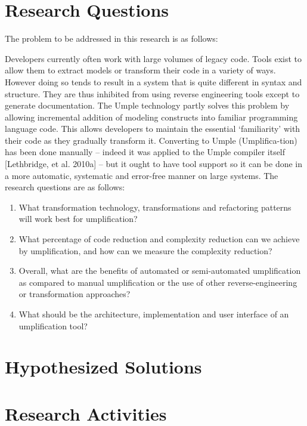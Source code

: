 \section{Research Questions}

The problem to be addressed in this research is as follows:

Developers currently often work with large volumes of legacy code. Tools exist to allow them to extract models or transform their code in a variety of ways. However doing so tends to result in a system that is quite different in syntax and structure. They are thus inhibited from using reverse engineering tools except to generate documentation. The Umple technology partly solves this problem by allowing incremental addition of modeling constructs into familiar programming language code. This allows developers to maintain the essential ‘familiarity’ with their code as they gradually transform it. Converting to Umple (Umplifica-tion) has been done manually – indeed it was applied to the Umple compiler itself [Lethbridge, et al. 2010a] –  but it ought to have tool support so it can be done in a more automatic, systematic and error-free manner on large systems.
The research questions are as follows:

\begin{enumerate}

\item What transformation technology, transformations and refactoring patterns will work best for umplification?
\item What percentage of code reduction and complexity reduction can we achieve by umplification, and how can we measure the complexity reduction?
\item Overall, what are the benefits of automated or semi-automated umplification as compared to manual umplification or the use of other reverse-engineering or transformation approaches?
\item What should be the architecture, implementation and user interface of an umplification tool?

\end{enumerate}

\section{Hypothesized Solutions}


\section{Research Activities}

